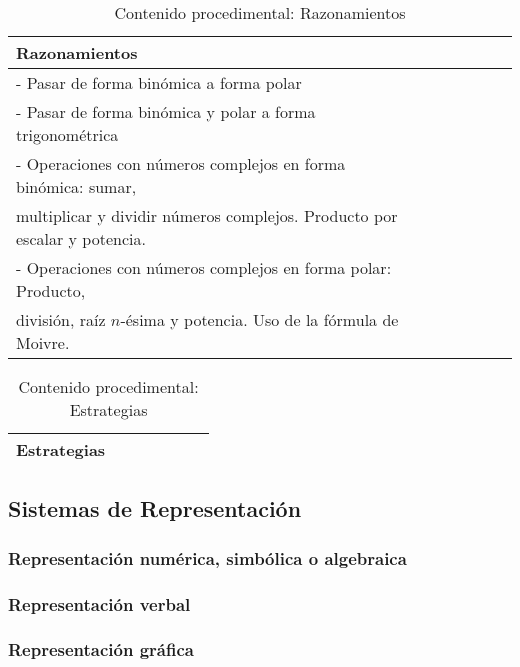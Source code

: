 \documentclass[../main.tex]{memoir}
\begin{document}
\begin{table}[H]
	\centering
	\begin{tabular}{lcccccc}
		\toprule
		\hspace{5.5cm}Razonamientos \\
		\midrule
		- Pasar de forma binómica a forma polar \\
		- Pasar de forma binómica y polar a forma trigonométrica\\
		- Operaciones con números complejos en forma binómica: sumar, \\ \hspace{0.2cm}multiplicar y dividir números complejos. Producto por escalar y potencia. \\
		- Operaciones con números complejos en forma polar: Producto, \\
		\hspace{0.2cm}división, raíz $n$-ésima y potencia. Uso de la fórmula de Moivre.\\
		\bottomrule
	\end{tabular}
	\caption{Contenido procedimental: Razonamientos}
	\label{tab:razonamientos}
\end{table}


\begin{table}[H]
	\centering
	\begin{tabular}{lcccccc}
		\toprule
		\hspace{5.5cm}Estrategias \\
		\midrule
		\bottomrule
	\end{tabular}
	\caption{Contenido procedimental: Estrategias}
	\label{tab:estrategias}
\end{table}



\subsection{Sistemas de Representación}

\subsubsection{Representación numérica, simbólica o algebraica}

\subsubsection{Representación verbal}

\subsubsection{Representación gráfica}
\end{document}

